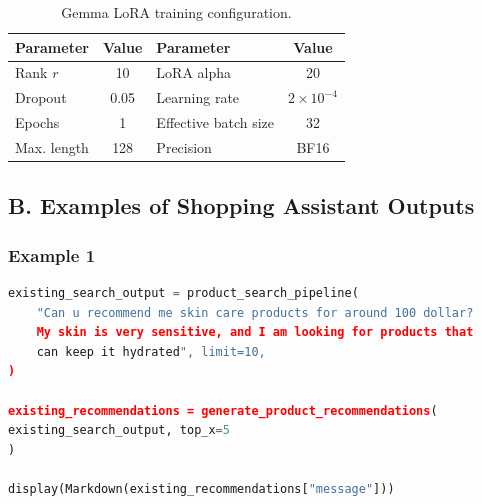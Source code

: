 \documentclass{article}
\begin{document}
\begin{table}[h]
\centering
\caption{Gemma LoRA training configuration.}
\label{tab:lora}
\small
\begin{tabular}{lc@{\qquad}lc}
\toprule
Parameter & Value & Parameter & Value \\
\midrule
Rank $r$ & 10 & LoRA alpha & 20 \\
Dropout & 0.05 & Learning rate & $2\times10^{-4}$ \\
Epochs & 1 & Effective batch size & 32 \\
Max. length & 128 & Precision & BF16 \\
\bottomrule
\end{tabular}
\end{table}

\subsection*{B. Examples of Shopping Assistant Outputs}

\subsubsection*{Example 1}

\begin{lstlisting}[language=Python]
existing_search_output = product_search_pipeline(
    "Can u recommend me skin care products for around 100 dollar? 
    My skin is very sensitive, and I am looking for products that 
    can keep it hydrated", limit=10,
)

existing_recommendations = generate_product_recommendations(
existing_search_output, top_x=5
)

display(Markdown(existing_recommendations["message"]))
\end{lstlisting}
\end{document}

